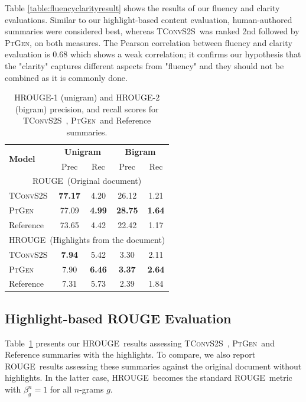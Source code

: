 \documentclass[11pt,a4paper]{article}
\newcommand\ptgen{\textsc{PtGen}}
\newcommand\tconv{\textsc{TConvS2S}}
\newcommand\hrouge{\textsc{HROUGE}}
\newcommand\rouge{\textsc{ROUGE}}
\begin{document}
Table \ref{table:fluencyclarityresult} shows the results of our 
fluency and clarity evaluations. Similar to our highlight-based content evaluation, human-authored summaries were considered best, whereas \tconv\  was  ranked  2nd  followed  by  \ptgen, on both measures. The Pearson correlation between fluency and clarity evaluation is 0.68 which shows a weak correlation; it confirms our hypothesis that the "clarity" captures different aspects from "fluency" and they should not be combined as it is commonly done. 

\begin{table}[t!]
\centering
\small
\begin{tabular}{l|cc|cc}
\hline
\multirow{2}{*}{\textbf{Model}} & \multicolumn{2}{c|}{\textbf{Unigram}} & \multicolumn{2}{c}{\textbf{Bigram}} \\
& Prec     & Rec  & Prec     & Rec     \\
\hline 
\multicolumn{5}{c}{\rouge\ (Original document)} \\
\hline
\tconv{}              & \textbf{77.17}    & 4.20    & 26.12    & 1.21    \\
\ptgen{}                  & 77.09    & \textbf{4.99}       & \textbf{28.75}    & \textbf{1.64}      \\
Reference              & 73.65    & 4.42    & 22.42    & 1.17      \\
\hline
\multicolumn{5}{c}{\hrouge\ (Highlights from the document)} \\
\hline
\tconv{}               &   \textbf{7.94}  &  5.42  & 3.30 &  2.11   \\
\ptgen{}                 & 7.90    & \textbf{6.46}      & \textbf{3.37}    & \textbf{2.64}     \\
Reference              &  7.31  & 5.73   &  2.39  & 1.84   \\
\hline
\end{tabular}
\caption{\hrouge-1 (unigram) and \hrouge-2 (bigram) precision, and recall scores for \tconv\ , \ptgen\  and Reference summaries.}
\label{table:rougeandhrougeresult}
\end{table}

\subsection{Highlight-based \rouge{} Evaluation} 

Table~\ref{table:rougeandhrougeresult} presents our \hrouge\ results assessing \tconv\ , \ptgen\  and Reference summaries with the highlights. To compare, we also report \rouge\ results assessing these summaries against the original document without highlights. In the latter case, \hrouge\ becomes the standard \rouge\ metric with $\beta^n_g=1$ for all $n$-grams $g$. 
\end{document}
